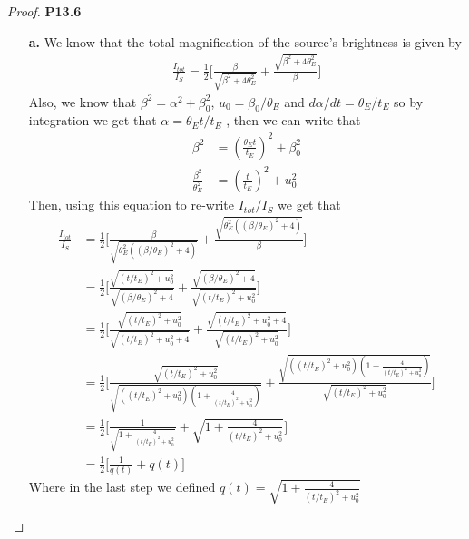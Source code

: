 \documentclass[11pt]{article}
\theoremstyle{definition}
\begin{document}
\cleardoublepage
\begin{proof}{\textbf{P13.6}}
\begin{itemize}
\item [\textbf{a.}] We know that the total magnification of the source's
brightness is given by
\begin{align*}
    \frac{I_{tot}}{I_S} = \frac{1}{2} \Bigg[
        \frac{\beta}{\sqrt{\beta^2 + 4\theta_E^2}} + \frac{\sqrt{\beta^2 + 4\theta_E^2}}{\beta}
    \Bigg]
\end{align*}
Also, we know that $\beta^2 = \alpha^2 + \beta_0^2$, 
$u_0 = \beta_0/\theta_E$ and $d\alpha/dt = \theta_E/t_E$ so by integration
we get that $\alpha = \theta_E t/t_E$ , then we can write that
\begin{align*}
    \beta^2 &= \left(\frac{\theta_E t}{t_E}\right)^2 + \beta_0^2\\
    \frac{\beta^2}{\theta_E^2} &= \left(\frac{t}{t_E}\right)^2 + u_0^2
\end{align*}
Then, using this equation to re-write $I_{tot}/I_S$ we get that
\begin{align*}
    \frac{I_{tot}}{I_S} &= \frac{1}{2} \Bigg[
        \frac{\beta}{\sqrt{\theta_E^2((\beta/\theta_E)^2 + 4)}}
        + \frac{\sqrt{\theta_E^2((\beta/\theta_E)^2 + 4)}}{\beta}
    \Bigg]\\
    &= \frac{1}{2} \Bigg[
        \frac{\sqrt{(t/t_E)^2 + u_0^2}}{\sqrt{(\beta/\theta_E)^2 + 4}}
        + \frac{\sqrt{(\beta/\theta_E)^2 + 4}}{\sqrt{(t/t_E)^2 + u_0^2}}
    \Bigg]\\
    &= \frac{1}{2} \Bigg[
        \frac{\sqrt{(t/t_E)^2 + u_0^2}}{\sqrt{(t/t_E)^2 + u_0^2 + 4}}
        + \frac{\sqrt{(t/t_E)^2 + u_0^2 + 4}}{\sqrt{(t/t_E)^2 + u_0^2}}
    \Bigg]\\
    &= \frac{1}{2} \Bigg[
        \frac{\sqrt{(t/t_E)^2 + u_0^2}}
        {\sqrt{((t/t_E)^2 + u_0^2)\left(1 + \frac{4}{(t/t_E)^2 + u_0^2}\right)}}
        + \frac{\sqrt{((t/t_E)^2 + u_0^2)\left(1 + \frac{4}{(t/t_E)^2 + u_0^2}\right)}}
        {\sqrt{(t/t_E)^2 + u_0^2}}
    \Bigg]\\
    &= \frac{1}{2} \Bigg[
        \frac{1}{\sqrt{1 + \frac{4}{(t/t_E)^2 + u_0^2}}}
        + \sqrt{1 + \frac{4}{(t/t_E)^2 + u_0^2}}
    \Bigg]\\
    &= \frac{1}{2} \Bigg[ \frac{1}{q(t)} + q(t) \Bigg]
\end{align*}
Where in the last step we defined $q(t) = \sqrt{1 + \frac{4}{(t/t_E)^2 + u_0^2}}$


\end{itemize}
\end{proof}
\end{document}
